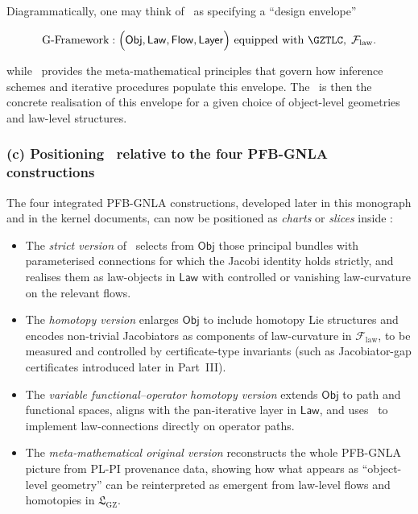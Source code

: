 \documentclass[11pt]{book}
\theoremstyle{plain}
\theoremstyle{definition}
\newcommand{\PLPIMMT}{\text{PL-PI MMT}}
\newcommand{\GFramework}{\text{G-Framework}} \newcommand{\GAlgebra}{\text{G-Algebra}}
\newcommand{\GZLS}{\ensuremath{\mathfrak{L}_{\mathrm{GZ}}}}       \newcommand{\GZLT}{\ensuremath{M_{!w}}}                           \newcommand{\GZLOC}{\ensuremath{A_M}}                             \newcommand{\GZLCurv}{\ensuremath{\mathcal{F}_{\mathrm{law}}}}
\begin{document}
Diagrammatically, one may think of \GFramework\ as specifying a
“design envelope”

\[
   \GFramework:
   \Bigl(
     \mathsf{Obj},\mathsf{Law},\mathsf{Flow},\mathsf{Layer}
   \Bigr)
   \text{ equipped with }
   \GZTLC,\;\GZLCurv.
\]

while \PLPIMMT\ provides the meta-mathematical principles that govern
how inference schemes and iterative procedures populate this envelope.
The \GZGMS\ is then the concrete realisation of this envelope for a
given choice of object-level geometries and law-level structures.


\subsubsection*{(c) Positioning \GZGMS\ relative to the four PFB-GNLA constructions}

The four integrated PFB-GNLA constructions, developed later in this
monograph and in the kernel documents, can now be positioned as
\emph{charts} or \emph{slices} inside \GZGMS:

\begin{itemize}
  \item The \emph{strict version} of \GAlgebra\ selects from
        $\mathsf{Obj}$ those principal bundles with parameterised
        connections for which the Jacobi identity holds strictly, and
        realises them as law-objects in $\mathsf{Law}$ with controlled
        or vanishing law-curvature on the relevant flows.
  \item The \emph{homotopy version} enlarges $\mathsf{Obj}$ to include
        homotopy Lie structures and encodes non-trivial Jacobiators as
        components of law-curvature in \GZLCurv, to be measured and
        controlled by certificate-type invariants (such as
        Jacobiator-gap certificates introduced later in Part~III).
  \item The \emph{variable functional–operator homotopy version}
        extends $\mathsf{Obj}$ to path and functional spaces, aligns
        with the pan-iterative layer in $\mathsf{Law}$, and uses
        \GZTLC\ to implement law-connections directly on operator
        paths.
  \item The \emph{meta-mathematical original version} reconstructs the
        whole PFB-GNLA picture from PL-PI provenance data, showing how
        what appears as “object-level geometry” can be reinterpreted
        as emergent from law-level flows and homotopies in \GZLS.
\end{itemize}
\end{document}
